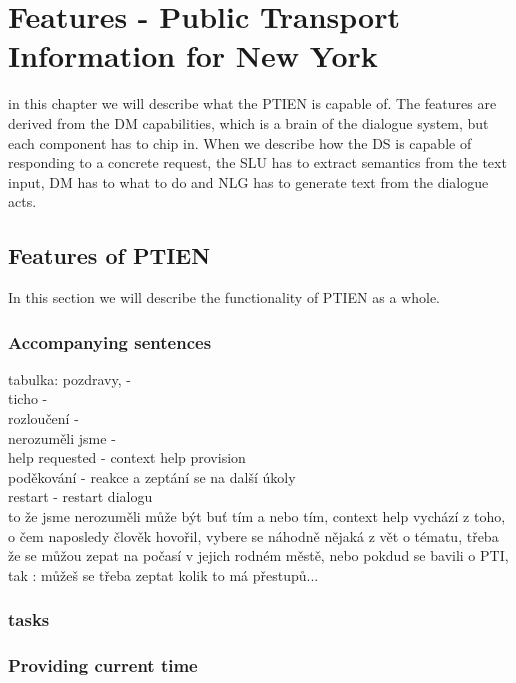 \chapter{Features - Public Transport Information for New York}

in this chapter we will describe what the PTIEN is capable of. The features are derived from the DM capabilities, which is a brain of the dialogue system, but each component has to chip in. When we describe how the DS is capable of responding to a concrete request, the SLU has to extract semantics from the text input, DM has to what to do and NLG has to generate text from the dialogue acts.


\section{Features of PTIEN}

In this section we will describe the functionality of PTIEN as a whole.

\subsection{Accompanying sentences}

tabulka:
pozdravy, -  \\
ticho -  \\
rozloučení -  \\
nerozuměli jsme -  \\
help requested - context help provision \\
poděkování - reakce a zeptání se na další úkoly \\
restart - restart dialogu \\

to že jsme nerozuměli může být buť tím a nebo tím,
context help vychází z toho, o čem naposledy člověk hovořil, vybere se náhodně nějaká z vět o tématu, třeba že se můžou zepat na počasí v jejich rodném městě, nebo pokdud se bavili o PTI, tak : můžeš se třeba zeptat kolik to má přestupů...




\subsection{tasks}

\subsection{Providing current time} \label{subsec:time}

